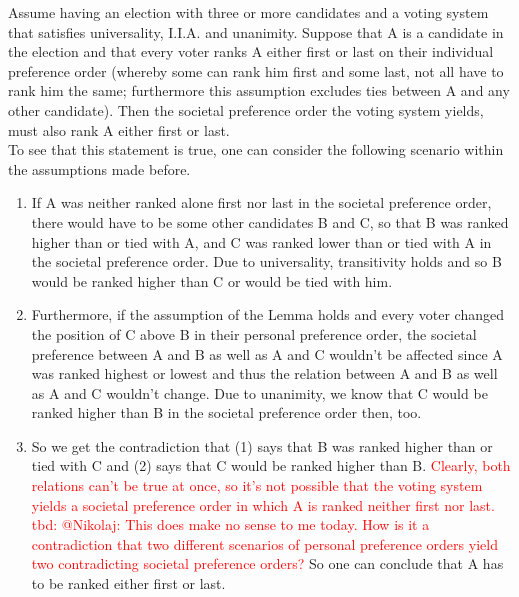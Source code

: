 Assume having an election with three or more candidates and a voting system that satisfies universality, I.I.A. and unanimity. Suppose that A is a candidate in the election and that every voter ranks A either first or last on their individual preference order (whereby some can rank him first and some last, not all have to rank him the same; furthermore this assumption excludes ties between A and any other candidate). Then the societal preference order the voting system yields, must also rank A either first or last. \\
\noindent To see that this statement is true, one can consider the following scenario within the assumptions made before. 
\begin{enumerate} 
\item If A was neither ranked alone first nor last in the societal preference order, there would have to be some other candidates B and C, so that B was ranked higher than or tied with A, and C was ranked lower than or tied with A in the societal preference order. 
Due to universality, transitivity holds and so B would be ranked higher than C or would be tied with him. \\

\item Furthermore, if the assumption of the Lemma holds and every voter changed the position of C above B in their personal preference order, the societal preference between A and B as well as A and C wouldn't be affected since A was ranked highest or lowest and thus the relation between A and B as well as A and C wouldn't change. Due to unanimity, we know that C would be ranked higher than B in the societal preference order then, too. 

\item So we get the contradiction that (1) says that B was ranked higher than or tied with C and (2) says that C would be ranked higher than B. \textcolor{red}{Clearly, both relations can't be true at once, so it's not possible that the voting system yields a societal preference order in which A is ranked neither first nor last. tbd: @Nikolaj: This does make no sense to me today. How is it a contradiction that two different scenarios of personal preference orders yield two contradicting societal preference orders?} So one can conclude that A has to be ranked either first or last. 
\end{enumerate}

